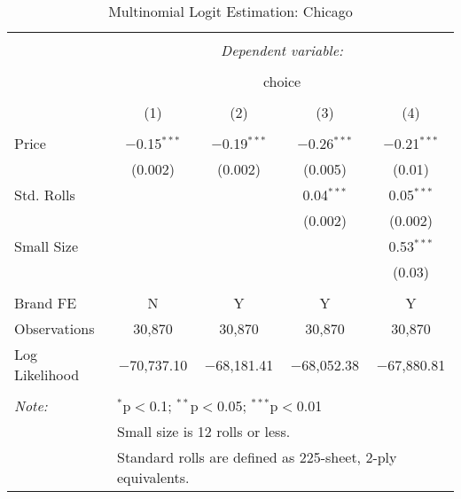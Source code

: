 
\begin{table}[!htbp] \centering 
  \caption{Multinomial Logit Estimation: Chicago} 
  \label{tab:mnlChicagoBaseline} 
\begin{tabular}{@{\extracolsep{5pt}}lcccc} 
\\[-1.8ex]\hline 
\hline \\[-1.8ex] 
 & \multicolumn{4}{c}{\textit{Dependent variable:}} \\ 
\cline{2-5} 
\\[-1.8ex] & \multicolumn{4}{c}{choice} \\ 
\\[-1.8ex] & (1) & (2) & (3) & (4)\\ 
\hline \\[-1.8ex] 
 Price & $-$0.15$^{***}$ & $-$0.19$^{***}$ & $-$0.26$^{***}$ & $-$0.21$^{***}$ \\ 
  & (0.002) & (0.002) & (0.005) & (0.01) \\ 
  Std. Rolls &  &  & 0.04$^{***}$ & 0.05$^{***}$ \\ 
  &  &  & (0.002) & (0.002) \\ 
  Small Size &  &  &  & 0.53$^{***}$ \\ 
  &  &  &  & (0.03) \\ 
 \hline \\[-1.8ex] 
Brand FE & N & Y & Y & Y \\ 
Observations & 30,870 & 30,870 & 30,870 & 30,870 \\ 
Log Likelihood & $-$70,737.10 & $-$68,181.41 & $-$68,052.38 & $-$67,880.81 \\ 
\hline 
\hline \\[-1.8ex] 
\textit{Note:}  & \multicolumn{4}{l}{$^{*}$p$<$0.1; $^{**}$p$<$0.05; $^{***}$p$<$0.01} \\ 
 & \multicolumn{4}{l}{Small size is 12 rolls or less.} \\ 
 & \multicolumn{4}{l}{Standard rolls are defined as 225-sheet, 2-ply equivalents.} \\ 
\end{tabular} 
\end{table} 
